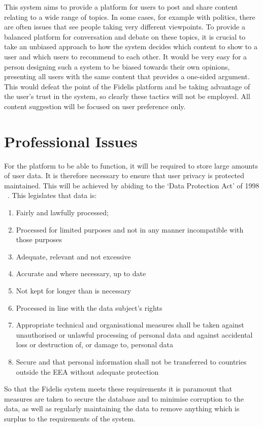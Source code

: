 This system aims to provide a platform for users to post and share content relating to a wide range of topics. In some cases, for example with politics, there are often issues that see people taking very different viewpoints. To provide a balanced platform for conversation and debate on these topics, it is crucial to take an unbiased approach to how the system decides which content to show to a user and which users to recommend to each other. It would be very easy for a person designing such a system to be biased towards their own opinions, presenting all users with the same content that provides a one-sided argument. This would defeat the point of the Fidelis platform and be taking advantage of the user’s trust in the system, so clearly these tactics will not be employed. All content suggestion will be focused on user preference only.

\section{Professional Issues}
For the platform to be able to function, it will be required to store large amounts of user data. It is therefore necessary to ensure that user privacy is protected maintained. This will be achieved by abiding to the `Data Protection Act' of 1998 ~\cite{DPA}. This legislates that data is:

\begin{enumerate}
\item Fairly and lawfully processed; 
\item Processed for limited purposes and not in any manner incompatible with those purposes
\item Adequate, relevant and not excessive
\item Accurate and where necessary, up to date
\item Not kept for longer than is necessary
\item Processed in line with the data subject's rights 
\item Appropriate technical and organisational measures shall be taken against unauthorised or unlawful processing of personal data and against accidental loss or destruction of, or damage to, personal data
\item Secure and that personal information shall not be transferred to countries outside the EEA without adequate protection
\end{enumerate}

So that the Fidelis system meets these requirements it is paramount that measures are taken to secure the database and to minimise corruption to the data, as well as regularly maintaining the data to remove anything which is surplus to the requirements of the system.